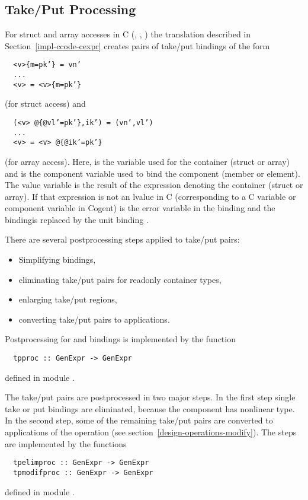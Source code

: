 \subsection{Take/Put Processing}
\label{impl-post-takeput}

For struct and array accesses in C (, , ) the translation described in Section~\ref{impl-ccode-cexpr}
creates pairs of take/put bindings of the form
\begin{verbatim}
  <v>{m=pk’} = vn’
  ...
  <v> = <v>{m=pk’}
\end{verbatim}
(for struct access) and
\begin{verbatim}
  (<v> @{@vl’=pk’},ik’) = (vn’,vl’)
  ...
  <v> = <v> @{@ik’=pk’}
\end{verbatim}
(for array access). Here,  is the variable used for the container (struct or array) and  is the component variable 
used to bind the component (member or element). The value variable  is the result of the expression denoting the container
(struct or array). If that expression is not an lvalue in C (corresponding to a C variable or component variable in Cogent) 
is the error variable  in the  binding and the  bindingis replaced by the unit binding \code{() = ()}.

There are several postprocessing steps applied to take/put pairs:
\begin{itemize}
\item Simplifying  bindings,
\item eliminating take/put pairs for readonly container types,
\item enlarging take/put regions,
\item converting take/put pairs to  applications.
\end{itemize}


Postprocessing for  and  bindings is implemented by the function
\begin{verbatim}
  tpproc :: GenExpr -> GenExpr
\end{verbatim}
defined in module .

The take/put pairs are postprocessed in two major steps. In the first step single take or put bindings are eliminated, because the component
has nonlinear type. In the second step, some of the remaining take/put pairs are converted to applications of the  operation
(see section~\ref{design-operations-modify}). The steps are implemented by the functions
\begin{verbatim}
  tpelimproc :: GenExpr -> GenExpr
  tpmodifproc :: GenExpr -> GenExpr
\end{verbatim}
defined in module .

